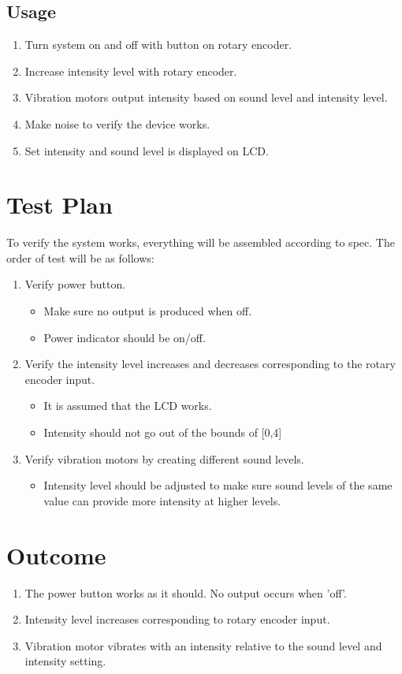 \documentclass{article}
\begin{document}
\subsection{Usage}
\begin{enumerate}
    \item Turn system on and off with button on rotary encoder.
    \item Increase intensity level with rotary encoder.
    \item Vibration motors output intensity based on sound level and intensity level.
    \item Make noise to verify the device works.
    \item Set intensity and sound level is displayed on LCD.
\end{enumerate}

\section{Test Plan}
    To verify the system works, everything will be assembled according to spec.  The order of test will be as follows:
    \begin{enumerate}
    \item Verify power button.
        \begin{itemize}
            \item Make sure no output is produced when off.
            \item Power indicator should be on/off.
        \end{itemize}
    \item Verify the intensity level increases and decreases corresponding to the rotary encoder input.
        \begin{itemize}
            \item It is assumed that the LCD works.
            \item Intensity should not go out of the bounds of [0,4]
        \end{itemize}
    \item Verify vibration motors by creating different sound levels.
        \begin{itemize}
            \item Intensity level should be adjusted to make sure sound levels of the same value can provide more intensity at higher levels.
        \end{itemize}
    \end{enumerate}
\section{Outcome}
\begin{enumerate}
    \item The power button works as it should. No output occurs when 'off'.
    \item Intensity level increases corresponding to rotary encoder input.
    \item Vibration motor vibrates with an intensity relative to the sound level and intensity setting.
\end{enumerate}
\end{document}
